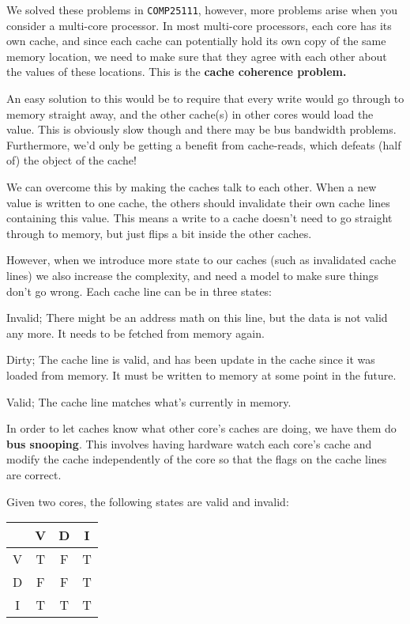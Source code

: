 We solved these problems in \texttt{COMP25111}, however, more problems arise
when you consider a multi-core processor. In most multi-core processors, each
core has its own cache, and since each cache can potentially hold its own copy
of the same memory location, we need to make sure that they agree with each
other about the values of these locations. This is the \textbf{cache coherence
problem.}

An easy solution to this would be to require that every write would go through
to memory straight away, and the other cache(s) in other cores would load the
value. This is obviously slow though and there may be bus bandwidth problems.
Furthermore, we'd only be getting a benefit from cache-reads, which defeats
(half of) the object of the cache!

We can overcome this by making the caches talk to each other. When a new value
is written to one cache, the others should invalidate their own cache lines
containing this value. This means a write to a cache doesn't need to go straight
through to memory, but just flips a bit inside the other caches.

However, when we introduce more state to our caches (such as invalidated cache
lines) we also increase the complexity, and need a model to make sure things
don't go wrong. Each cache line can be in three states:

\begin{description}
  \item Invalid; There might be an address math on this line, but the data is 
  not valid any more. It needs to be fetched from memory again.
  \item Dirty; The cache line is valid, and has been update in the cache since 
  it was loaded from memory. It must be written to memory at some point in the 
  future.
  \item Valid; The cache line matches what's currently in memory.
\end{description}

In order to let caches know what other core's caches are doing, we have them do
\textbf{bus snooping}. This involves having hardware watch each core's cache and
modify the cache independently of the core so that the flags on the cache lines
are correct.

Given two cores, the following states are valid and invalid:

\begin{center}
  \begin{tabular}{c|c c c}
      & V & D & I\\ \hline
    V & T & F & T\\
    D & F & F & T\\
    I & T & T & T
  \end{tabular}
\end{center}

